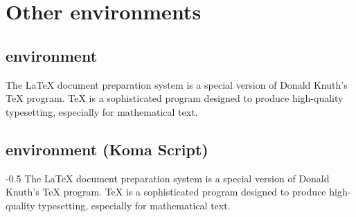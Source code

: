 %
%
\section{Other environments}
\subsection{ environment}

\begin{filecontents*}{\democodefile}
\begin{abstract}
\LaTeX{} is a document markup language and document preparation 
system for the \TeX{} typesetting program.
\end{abstract}
The \LaTeX{} document preparation system is a special version of Donald
Knuth's \TeX{} program. \TeX{} is a sophisticated program designed to 
produce high-quality typesetting, especially for mathematical text.
\end{filecontents*}

%

\subsection{ environment (Koma Script)}
\label{sec:EnvAddmargin}

\begin{filecontents*}{\democodefile}
\begin{addmargin}[0cm]{-0.5\marginwidth}
The \LaTeX{} document preparation system is a special version of Donald
Knuth's \TeX{} program. \TeX{} is a sophisticated program designed to 
produce high-quality typesetting, especially for mathematical text.
\end{addmargin}
\end{filecontents*}

%



